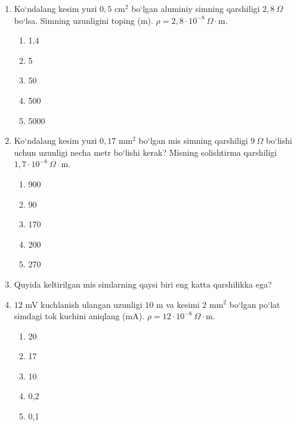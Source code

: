 \begin{enumerate}
\item Ko‘ndalang kesim yuzi $0,5$ cm$^2$ bo‘lgan aluminiy simning qarshiligi $2,8~\Omega$ bo‘lsa. Simning uzunligini toping (m). $\rho=2,8\cdot10^{-8}~\Omega\cdot$m.
\begin{enumerate}[label=\Alph*)]
\item 1,4
\item 5
\item 50
\item 500
\item 5000
\end{enumerate}

\item Ko‘ndalang kesim yuzi $0,17$ mm$^2$ bo‘lgan mis simning qarshiligi $9~\Omega$ bo‘lishi uchun uzunligi necha metr bo‘lishi kerak? Misning solishtirma qarshiligi $1,7\cdot10^{-8}~\Omega\cdot$m.
\begin{enumerate}[label=\Alph*)]
\item 900
\item 90
\item 170
\item 200
\item 270
\end{enumerate}

\item Quyida keltirilgan mis simlarning qaysi biri eng katta qarshilikka ega?



\item $12$ mV kuchlanish ulangan uzunligi $10$ m va kesimi $2$ mm$^2$ bo‘lgan po‘lat simdagi tok kuchini aniqlang (mA). $\rho=12\cdot10^{-8}~\Omega\cdot$m.
\begin{enumerate}[label=\Alph*)]
\item 20
\item 17
\item 10
\item 0,2
\item 0,1
\end{enumerate}


\end{enumerate}
